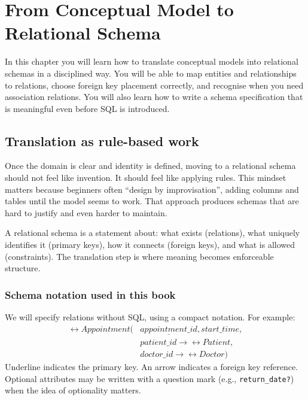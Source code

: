 \chapter{From Conceptual Model to Relational Schema}

\begin{learningobjectives}
In this chapter you will learn how to translate conceptual models into relational schemas in a disciplined way.
You will be able to map entities and relationships to relations, choose foreign key placement correctly, and recognise when you need association relations.
You will also learn how to write a schema specification that is meaningful even before SQL is introduced.
\end{learningobjectives}

\section{Translation as rule-based work}
Once the domain is clear and identity is defined, moving to a relational schema should not feel like invention.
It should feel like applying rules.
This mindset matters because beginners often “design by improvisation”, adding columns and tables until the model seems to work.
That approach produces schemas that are hard to justify and even harder to maintain.

A relational schema is a statement about:
what exists (relations), what uniquely identifies it (primary keys), how it connects (foreign keys), and what is allowed (constraints).
The translation step is where meaning becomes enforceable structure.

\subsection{Schema notation used in this book}
We will specify relations without SQL, using a compact notation.
For example:
\[
\begin{aligned}
\rel{Appointment}(&\underline{appointment\_id}, start\_time, \\
&patient\_id \rightarrow \rel{Patient}, \\
&doctor\_id \rightarrow \rel{Doctor})
\end{aligned}
\]
Underline indicates the primary key.
An arrow indicates a foreign key reference.
Optional attributes may be written with a question mark (e.g., \texttt{return\_date?}) when the idea of optionality matters.

